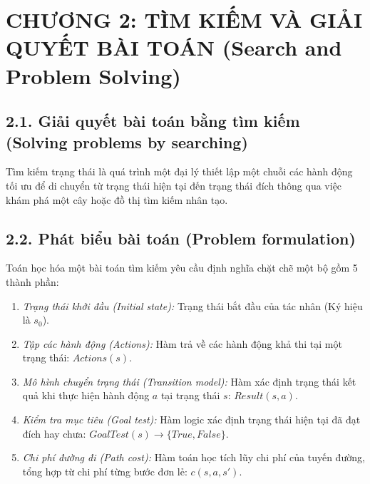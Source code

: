 \documentclass[../main.tex]{subfiles}
\begin{document}

\section{CHƯƠNG 2: TÌM KIẾM VÀ GIẢI QUYẾT BÀI TOÁN (Search and Problem Solving)}

\subsection{2.1. Giải quyết bài toán bằng tìm kiếm (Solving problems by searching)}
Tìm kiếm trạng thái là quá trình một đại lý thiết lập một chuỗi các hành động tối ưu để di chuyển từ trạng thái hiện tại đến trạng thái đích thông qua việc khám phá một cây hoặc đồ thị tìm kiếm nhân tạo.

\subsection{2.2. Phát biểu bài toán (Problem formulation)}
Toán học hóa một bài toán tìm kiếm yêu cầu định nghĩa chặt chẽ một bộ gồm 5 thành phần:
\begin{enumerate}
    \item \textit{Trạng thái khởi đầu (Initial state):} Trạng thái bắt đầu của tác nhân (Ký hiệu là $s_0$).
    \item \textit{Tập các hành động (Actions):} Hàm trả về các hành động khả thi tại một trạng thái: $Actions(s)$.
    \item \textit{Mô hình chuyển trạng thái (Transition model):} Hàm xác định trạng thái kết quả khi thực hiện hành động $a$ tại trạng thái $s$: $Result(s, a)$.
    \item \textit{Kiểm tra mục tiêu (Goal test):} Hàm logic xác định trạng thái hiện tại đã đạt đích hay chưa: $GoalTest(s) \rightarrow \{True, False\}$.
    \item \textit{Chi phí đường đi (Path cost):} Hàm toán học tích lũy chi phí của tuyến đường, tổng hợp từ chi phí từng bước đơn lẻ: $c(s, a, s')$.
\end{enumerate}
\end{document}
